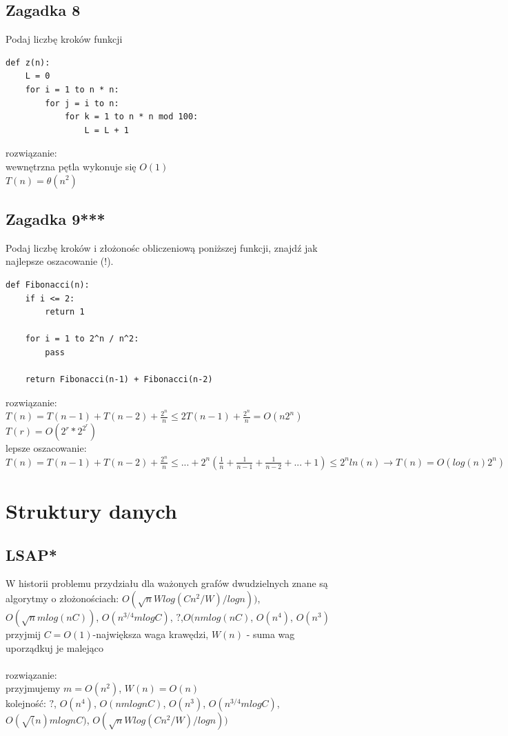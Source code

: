 \documentclass{article}
\begin{document}
\subsection*{Zagadka 8}
Podaj liczbę kroków funkcji
\begin{lstlisting}
def z(n):
	L = 0
	for i = 1 to n * n:
		for j = i to n:
			for k = 1 to n * n mod 100:
				L = L + 1
\end{lstlisting}
rozwiązanie: \\
wewnętrzna pętla wykonuje się $O(1)$ \\
$T(n) = \theta(n^2)$

\subsection*{Zagadka 9***}
Podaj liczbę kroków i złożonośc obliczeniową poniższej funkcji, znajdź jak najlepsze oszacowanie (!).
\begin{lstlisting}
def Fibonacci(n):
	if i <= 2:
		return 1

	for i = 1 to 2^n / n^2:
		pass
	
	return Fibonacci(n-1) + Fibonacci(n-2)

\end{lstlisting}
rozwiązanie: \\
$T(n) = T(n-1) + T(n-2) + \frac{2^n}{n} \leq 2T(n-1) + \frac{2^n}{n} = O(n2^n)$ \\
$T(r) = O(2^r * 2^{2^r})$ \\
lepsze oszacowanie: $T(n) = T(n-1) + T(n-2) + \frac{2^n}{n} \leq ... + 2^n(\frac{1}{n} + \frac{1}{n-1} + \frac{1}{n-2} + ... + 1) \leq 2^n ln(n) \rightarrow T(n) = O(log(n) 2^n)$ 

\section{Struktury danych}
\subsection*{LSAP*}
W historii problemu przydziału dla ważonych grafów dwudzielnych znane są algorytmy o złożonościach:
$O(\sqrt{n}Wlog(Cn^2/W)/logn))$, $O(\sqrt{n}mlog(nC))$, $O(n^{3/4}mlogC)$, $?$,$O(nmlog(nC)$, $O(n^4)$, $O(n^3)$
\\ przyjmij $C = O(1)$-największa waga krawędzi,  $W(n)$ - suma wag \\ uporządkuj je malejąco \\\\
rozwiązanie: \\
przyjmujemy $m = O(n^2)$, $ W(n) = O(n)$ \\
kolejność: $?$, $O(n^4)$,  $O(nmlognC)$, $O(n^3)$, $O(n^{3/4}mlogC)$, $O(\sqrt(n)mlognC)$, $O(\sqrt{n}Wlog(Cn^2/W)/logn))$
\end{document}
